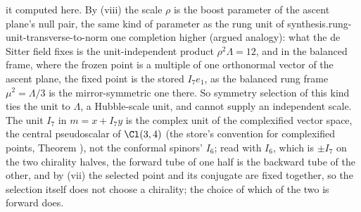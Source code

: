it computed here. By (viii) the scale $\rho$ is the boost parameter of the ascent plane's null pair, the same kind of parameter as the rung unit of synthesis.rung-unit-transverse-to-norm one completion higher (argued analogy): what the de Sitter field fixes is the unit-independent product $\rho^{2}\Lambda = 12$, and in the balanced frame, where the frozen point is a multiple of one orthonormal vector of the ascent plane, the fixed point is the stored $I_{7}e_{1}$, as the balanced rung frame $\mu^{2} = \Lambda/3$ is the mirror-symmetric one there. So symmetry selection of this kind ties the unit to $\Lambda$, a Hubble-scale unit, and cannot supply an independent scale. The unit $I_{7}$ in $m = x + I_{7}y$ is the complex unit of the complexified vector space, the central pseudoscalar of $\Cl(3,4)$ (the store's convention for complexified points, Theorem ), not the conformal spinors' $I_{6}$; read with $I_{6}$, which is $\pm I_{7}$ on the two chirality halves, the forward tube of one half is the backward tube of the other, and by (vii) the selected point and its conjugate are fixed together, so the selection itself does not choose a chirality; the choice of which of the two is forward does.
